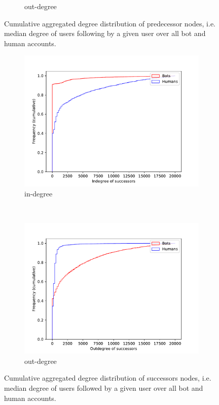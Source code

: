 \begin{figure}[t!]
\begin{subfigure}[t]{0.5\textwidth}
        \caption{out-degree}
    \end{subfigure}
    \caption{Cumulative aggregated degree distribution of predecessor nodes, i.e. median degree of users following by a given user over all bot and human accounts.}
    \label{fig:cum_degrees_predecessors}
\end{figure}

\begin{figure}[t!]
    \centering
    \begin{subfigure}[t]{0.5\textwidth}
        \centering
        \includegraphics[width=\textwidth]{FIG/indegree_succ.pdf}
        \caption{in-degree}
    \end{subfigure}%
    ~ 
    \begin{subfigure}[t]{0.5\textwidth}
        \centering
        \includegraphics[width=\textwidth]{FIG/outdegree_succ.pdf}
        \caption{out-degree}
    \end{subfigure}
    \caption{Cumulative aggregated degree distribution of successors nodes, i.e. median degree of users followed by a given user over all bot and human accounts.}
    \label{fig:cum_degrees_successors}
\end{figure}

